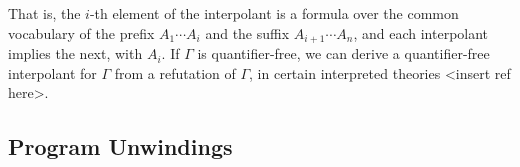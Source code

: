 That is, the $i$-th element of the interpolant is a formula over the common vocabulary of the prefix $A_1 \cdots A_i$ and the suffix $A_{i+1} \cdots A_n$, and each interpolant implies the next, with $A_i$. If $\Gamma$ is quantifier-free, we can derive a quantifier-free interpolant for $\Gamma$ from a refutation of $\Gamma$, in certain interpreted theories <insert ref here>.

\subsection{Program Unwindings}

